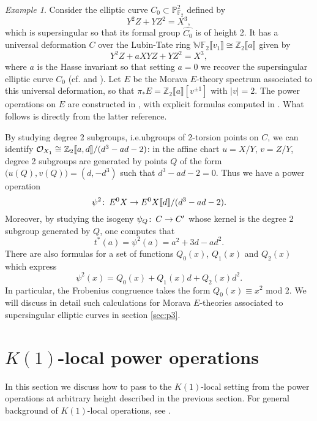 \documentclass{gtpart}
\theoremstyle{definition}
\theoremstyle{remark}
\newtheorem{exam}[thm]{Example}
\def\co{\colon\thinspace}
\newcommand{\mb}[1]{\mathbb{#1}}
\newcommand{\CO}{{\cal O}}
\begin{document}
\begin{exam}
\label{ex:h2p2}
Consider the elliptic curve $C_0 \subset {\mb P}_{{\mb F}_2}^2$ defined 
by
\[
 Y^2 Z + Y Z^2 = X^3,
\]
which is supersingular so that its formal group $\widehat{C_0}$ is of 
height 2.  It has a universal deformation $C$ over the Lubin-Tate ring 
${\mb W}{\mb F}_2 \llbracket v_1 \rrbracket \cong 
{\mb Z}_2 \llbracket a \rrbracket$ given by 
\[
 Y^2 Z + a X Y Z + Y Z^2 = X^3,
\]
where $a$ is the Hasse invariant so that setting $a=0$ we recover the 
supersingular elliptic curve $C_0$ (cf. \cite[2.2.10]{katzmazur} 
and \cite[proposition 3.2]{tmf3}).  Let $E$ be the Morava $E$-theory 
spectrum associated to this universal deformation, so that $\pi_* E = 
{\mb Z}_2 \llbracket a \rrbracket [v^{\pm 1}]$ with $|v| = 2$.  The power 
operations on $E$ are constructed in \cite[section 3]{Andu}, with explicit formulas 
computed in \cite[sections 3 and 4]{h2p2}.  What follows is directly from the latter reference.  

By studying degree 2 subgroups, i.e.ubgroups of 2-torsion 
points on $C$, we can identify $\CO_{X_1} \cong 
{\mb Z}_2 \llbracket a,d \rrbracket / (d^3 - a d - 2)$: in the affine 
chart $u = X/Y$, $v = Z/Y$, degree 2 subgroups are generated by points 
$Q$ of the form $\big(u(Q), v(Q)\big) = (d, -d^3)$ such that 
$d^3 - a d - 2 = 0$.  Thus we have a power operation 
\[
 \psi^2\co E^0 X \to E^0 X \llbracket d \rrbracket / (d^3 - a d - 2).
\]
Moreover, by studying the isogeny $\psi_Q\co C \to C'$ whose kernel is 
the degree 2 subgroup generated by $Q$, one computes that 
\[
 t^* (a) = \psi^2 (a) = a^2 + 3 d - a d^2.
\]
There are also formulas for a set of functions $Q_0(x)$, 
$Q_1(x)$ and $Q_2(x)$ which express
\[
 \psi^2 (x) = Q_0(x) + Q_1(x) d + Q_2(x) d^2.
\]
In particular, the Frobenius congruence takes the form 
$Q_0(x) \equiv x^2$ mod 2.  We will discuss in detail such calculations 
for Morava $E$-theories associated to supersingular elliptic curves in 
section \ref{sec:p3}.  
\end{exam}


\section{$K(1)$-local power operations}
\label{sec:K(1)}


In this section we discuss how to pass to the $K(1)$-local setting from 
the power operations at arbitrary height described in the previous 
section.  For general background of $K(1)$-local operations, see 
\cite{k1}.
\end{document}
